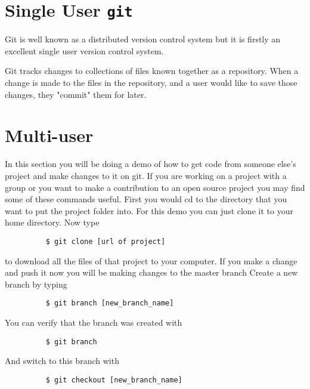 \documentclass[11pt]{report}
\begin{document}
\chapter{Single User \texttt{git}}
Git is well known as a distributed version control system but it is
firstly an excellent single user version control system.

Git tracks changes to collections of files known together as a repository.
When a change is made to the files in the repository, and a user would like
to save those changes, they "commit" them for later.


\chapter{Multi-user}
In this section you will be doing a demo of how to get code from
someone else's project and make changes to it on git. If you are
working on a project with a group or you want to make a contribution
to an open source project you may find some of these commands useful.
First you would cd to the directory that you want to put the project
folder into.  For this demo you can just clone it to your home
directory.  Now type

\begin{figure}[H]
  \begin{lstlisting}
    $ git clone [url of project]
  \end{lstlisting}
\end{figure}


to download all the files of that project to your computer.  If you
make a change and push it now you will be making changes to the master
branch Create a new branch by typing

\begin{figure}[H]
  \begin{lstlisting}
    $ git branch [new_branch_name]
  \end{lstlisting}
\end{figure}

You can verify that the branch was created with

\begin{figure}[H]
  \begin{lstlisting}
    $ git branch
  \end{lstlisting}
\end{figure}

And switch to this branch with

\begin{figure}[H]
  \begin{lstlisting}
    $ git checkout [new_branch_name]
  \end{lstlisting}
\end{figure}
\end{document}
